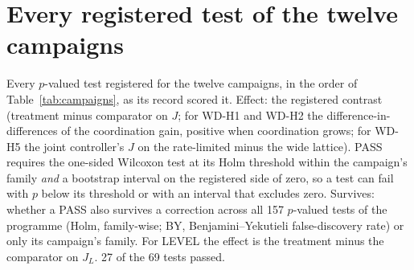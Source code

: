 \documentclass[preprint,12pt]{elsarticle}
\begin{document}
\appendix
\section{Every registered test of the twelve campaigns}
\label{app:tests}

Every $p$-valued test registered for the twelve campaigns, in the order of
Table~\ref{tab:campaigns}, as its record scored it. Effect: the registered
contrast (treatment minus comparator on $J$; for WD-H1 and WD-H2 the
difference-in-differences of the coordination gain, positive when
coordination grows; for WD-H5 the joint controller's $J$ on the rate-limited
minus the wide lattice). PASS requires the one-sided Wilcoxon test at its
Holm threshold within the campaign's family \emph{and} a bootstrap interval on
the registered side of zero, so a test can fail with $p$ below its
threshold or with an interval that excludes zero. Survives: whether a PASS
also survives a correction across all 157 $p$-valued tests of the programme
(Holm, family-wise; BY, Benjamini--Yekutieli false-discovery rate) or only
its campaign's family. For LEVEL the effect is the treatment minus the
comparator on $J_L$. 27 of the 69 tests passed.

{\scriptsize\setlength{\tabcolsep}{3pt}
}
\end{document}
